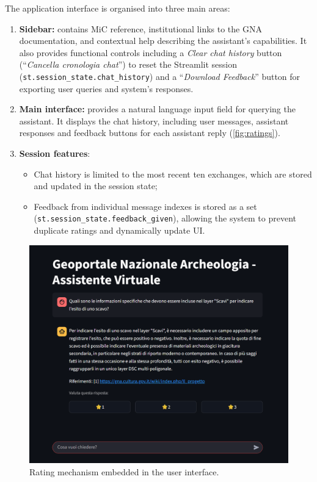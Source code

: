 \begin{spacing}{1.5}
\noindent The application interface is organised into three main areas:
\begin{enumerate}
      \item \textbf{Sidebar:} contains MiC reference, institutional links to the GNA documentation, and contextual help describing the assistant’s capabilities. It also provides functional controls including a \textit{Clear chat history} button (``\textit{Cancella cronologia chat}'') to reset the Streamlit session (\texttt{st.session\_state.chat\_history}) and a ``\textit{Download Feedback}'' button for exporting user queries and system's responses.
      \item \textbf{Main interface:} provides a natural language input field for querying the assistant. It displays the chat history, including user messages, assistant responses and feedback buttons for each assistant reply (\autoref{fig:ratings}).
      \item \textbf{Session features}: 
      \begin{itemize}
            \item Chat history is limited to the most recent ten exchanges, which are stored and updated in the session state;
            \item Feedback from individual message indexes is stored as a set (\texttt{st.session\_state.feedback\_given}), allowing the system to prevent duplicate ratings and dynamically update UI.
      \end{itemize}
\end{enumerate}


\begin{figure}[H]
  \centering
  \includegraphics[width=\textwidth]{images/ui_ratings.png} 
  \caption{Rating mechanism embedded in the user interface.}
  \label{fig:ratings}
\end{figure}



\end{spacing}

